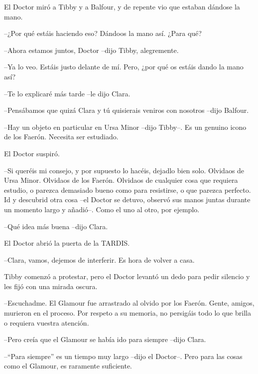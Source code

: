 {El Doctor miró a Tibby y a Balfour, y de repente vio que estaban dándose
la mano.}

{--¿Por qué estáis haciendo eso? Dándoos la mano así. ¿Para qué?}

{--Ahora estamos juntos, Doctor --dijo Tibby, alegremente.}

{--Ya lo veo. Estáis justo delante de mí. Pero, ¿por qué os estáis dando
la mano así?}

{--Te lo explicaré más tarde --le dijo Clara.}

{--Pensábamos que quizá Clara y tú quisierais veniros con nosotros --dijo
Balfour.}

{--Hay un objeto en particular en Ursa Minor --dijo Tibby--. Es un
genuino icono de los Faerón. Necesita ser estudiado.}

{El Doctor suspiró.}

{--Si queréis mi consejo, y por supuesto lo hacéis, dejadlo bien solo.
 Olvidaos de Ursa Minor. Olvidaos de los Faerón. Olvidaos de cualquier
 cosa que requiera estudio, o parezca demasiado bueno como para
 resistirse, o que parezca perfecto. Id y descubrid otra cosa --el Doctor
 se detuvo, observó sus manos juntas durante un momento largo y añadió--.
Como el uno al otro, por ejemplo.}

{--Qué idea más buena --dijo Clara.}

{El Doctor abrió la puerta de la TARDIS.}

{--Clara, vamos, dejemos de interferir. Es hora de volver a casa.}

{Tibby comenzó a protestar, pero el Doctor levantó un dedo para pedir
silencio y les fijó con una mirada oscura.}

{--Escuchadme. El Glamour fue arrastrado al olvido por los Faerón. Gente,
 amigos, murieron en el proceso. Por respeto a su memoria, no persigáis
todo lo que brilla o requiera vuestra atención.}

{--Pero creía que el Glamour se había ido para siempre --dijo Clara.}

{--``Para siempre'' es un tiempo muy largo --dijo el Doctor--. Pero para
las cosas como el Glamour, es raramente suficiente.}
